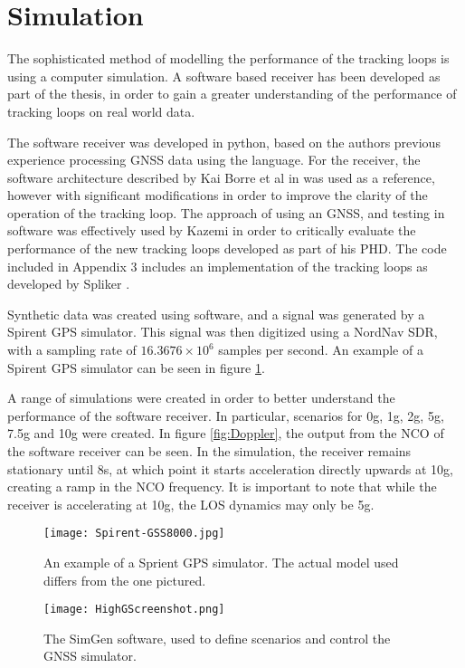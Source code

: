 \section{Simulation}

The sophisticated method of modelling the performance of the tracking loops is using a computer simulation. A software based receiver has been developed as part of the thesis, in order to gain a greater understanding of the performance of tracking loops on real world data. 

The software receiver was developed in python, based on the authors previous experience processing GNSS data using the language. For the receiver, the software architecture described by Kai Borre et al in \cite{KaiBorre} was used as a reference, however with significant modifications in order to improve the clarity of the operation of the tracking loop. The approach of using an \ac{GNSS}, and testing in software was effectively used by Kazemi \cite{KazemiPHD} in order to critically evaluate the performance of the new tracking loops developed as part of his PHD. The code included in Appendix 3 includes an implementation of the tracking loops as developed by Spliker \cite{Spilker}.

Synthetic data was created using software, and a signal was generated by a Spirent \ac{GPS} simulator. This signal was then digitized using a NordNav \ac{SDR}, with a sampling rate of $16.3676 \times 10^6$ samples per second. An example of a Spirent \ac{GPS} simulator can be seen in figure \ref{fig:Spirent}.

A range of simulations were created in order to better understand the performance of the software receiver. In particular, scenarios for 0g, 1g, 2g, 5g, 7.5g and 10g were created. In figure \ref{fig:Doppler}, the output from the \ac{NCO} of the software receiver can be seen. In the simulation, the receiver remains stationary until 8s, at which point it starts acceleration directly upwards at 10g, creating a ramp in the \ac{NCO} frequency. It is important to note that while the receiver is accelerating at 10g, the \ac{LOS} dynamics may only be 5g. 

\begin{figure}[!htb] 
    \centering
    \texttt{[image: Spirent-GSS8000.jpg]} 
    \caption{An example of a Sprient \ac{GPS} simulator. The actual model used differs from the one pictured.}
    \label{fig:Spirent}
\end{figure}

\begin{figure}[!htb] 
    \centering
    \texttt{[image: HighGScreenshot.png]} 
    \caption{The SimGen software, used to define scenarios and control the \ac{GNSS} simulator.}
    \label{fig:HighGScreenshot}
\end{figure}


